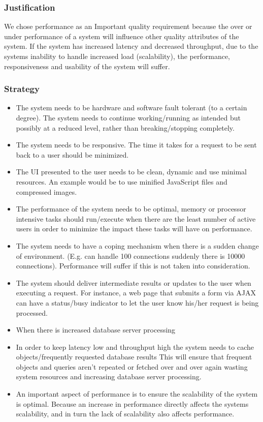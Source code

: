 \documentclass[a4paper,12pt,titlepage]{article}
\begin{document}
	\subsubsection*{Justification}
	We chose performance as an Important quality requirement because the over or under performance of a system will influence other quality attributes of the system. If the system has increased latency and decreased throughput, due to the systems inability to handle increased load (scalability), the performance, responsiveness and usability of the system will suffer. 
	\subsubsection*{Strategy}
	\begin{itemize}
		\item The system needs to be hardware and software fault tolerant (to a certain degree). The system needs to continue working/running as intended but possibly at a reduced level, rather than breaking/stopping completely.
		\item The system needs to be responsive. The time it takes for a request to be sent back to a user should be minimized. 
		\item The UI presented to the user needs to be clean, dynamic and use minimal resources. An example would be to use minified JavaScript files and compressed images.
		\item The performance of the system needs to be optimal, memory or processor intensive tasks should run/execute when there are the least number of active users in order to minimize the impact these tasks will have on performance.
		\item The system needs to have a coping mechanism when there is a sudden change of environment. (E.g. can handle 100 connections suddenly there is 10000 connections). Performance will suffer if this is not taken into consideration.
		\item The system should deliver intermediate results or updates to the user when executing a request. For instance, a web page that submits a form via AJAX can have a status/busy indicator to let the user know his/her request is being processed.
		\item When there is increased database server processing 
		\item In order to keep latency low and throughput high the system needs to cache objects/frequently requested database results This will ensure that frequent objects and queries aren't repeated or fetched over and over again wasting system resources and increasing database server processing.
		\item An important aspect of performance is to ensure the scalability of the system is optimal. Because an increase in performance directly affects the systems scalability, and in turn the lack of scalability also affects performance.
	\end{itemize}
	\newpage
\end{document}
